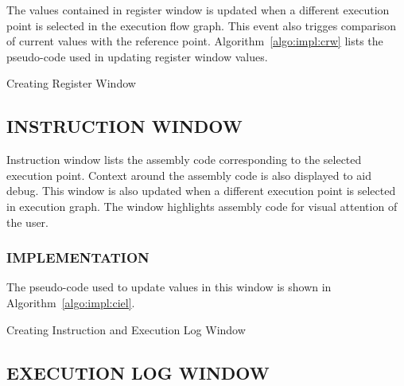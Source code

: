 The values contained in register window is updated when a different execution point is selected in the execution flow graph. This event also trigges comparison of current values with the reference point. Algorithm~\ref{algo:impl:crw} lists the pseudo-code used in updating register window values.

\IncMargin{1em}
\begin{algorithm}[h]
\DontPrintSemicolon
{} 
\BlankLine
{}
\caption{Creating Register Window}
\label{algo:impl:crw}
\end{algorithm}\DecMargin{1em}

\subsection {INSTRUCTION WINDOW}

Instruction window lists the assembly code corresponding to the selected execution point. Context around the assembly code is also displayed to aid debug. This window is also updated when a different execution point is selected in execution graph. The window highlights assembly code for visual attention of the user.

\subsubsection{IMPLEMENTATION}

The pseudo-code used to update values in this window is shown in Algorithm~\ref{algo:impl:ciel}.

\IncMargin{1em}
\begin{algorithm}[h]
\DontPrintSemicolon
{} 
\caption{Creating Instruction and Execution Log Window}
\label{algo:impl:ciel}
\end{algorithm}\DecMargin{1em}

\subsection {EXECUTION LOG WINDOW}

